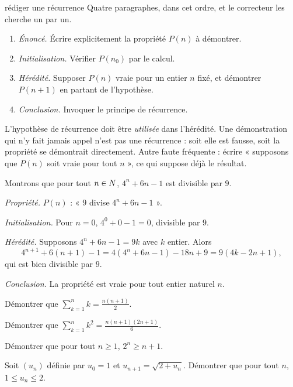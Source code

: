 \begin{methode}{rédiger une récurrence}
Quatre paragraphes, dans cet ordre, et le correcteur les cherche un par un.
\begin{enumerate}[label=\textbf{\arabic*.}, leftmargin=*, itemsep=0.15em]
  \item \emph{Énoncé.} Écrire explicitement la propriété $P(n)$ à démontrer.
  \item \emph{Initialisation.} Vérifier $P(n_{0})$ par le calcul.
  \item \emph{Hérédité.} Supposer $P(n)$ vraie pour un entier $n$ fixé, et
        démontrer $P(n+1)$ en partant de l'hypothèse.
  \item \emph{Conclusion.} Invoquer le principe de récurrence.
\end{enumerate}
\end{methode}

\begin{avertissement}
L'hypothèse de récurrence doit être \emph{utilisée} dans l'hérédité. Une
démonstration qui n'y fait jamais appel n'est pas une récurrence : soit elle
est fausse, soit la propriété se démontrait directement. Autre faute
fréquente : écrire « supposons que $P(n)$ soit vraie pour tout $n$ », ce qui
suppose déjà le résultat.
\end{avertissement}

\begin{exemple}
Montrons que pour tout $n \in N$, $4^{n}+6n-1$ est divisible par $9$.

\emph{Propriété.} $P(n)$ : « $9$ divise $4^{n}+6n-1$ ».

\emph{Initialisation.} Pour $n = 0$, $4^{0}+0-1 = 0$, divisible par $9$.

\emph{Hérédité.} Supposons $4^{n}+6n-1 = 9k$ avec $k$ entier. Alors
\[
  4^{n+1}+6(n+1)-1 = 4\left(4^{n}+6n-1\right)-18n+9
  = 9\left(4k-2n+1\right),
\]
qui est bien divisible par $9$.

\emph{Conclusion.} La propriété est vraie pour tout entier naturel $n$.
\end{exemple}

\begin{entrainement}[récurrence]
\exo[\niveau{1}] Démontrer que $\displaystyle\sum_{k=1}^{n}k
= \frac{n(n+1)}{2}$.

\exo[\niveau{2}] Démontrer que $\displaystyle\sum_{k=1}^{n}k^{2}
= \frac{n(n+1)(2n+1)}{6}$.

\exo[\niveau{2}] Démontrer que pour tout $n \geq 1$, $2^{n} \geq n+1$.

\exo[\niveau{3}] Soit $(u_{n})$ définie par $u_{0} = 1$ et
$u_{n+1} = \sqrt{2+u_{n}}$. Démontrer que pour tout $n$,
$1 \leq u_{n} \leq 2$.
\end{entrainement}

